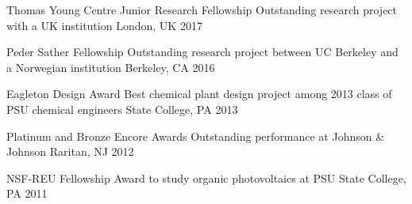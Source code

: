 
\begin{cvhonors}

  \cvhonor
    {Thomas Young Centre Junior Research Fellowship} %
    {Outstanding research project with a UK institution} %
    {London, UK} %
    {2017} %

  \cvhonor
    {Peder Sather Fellowship} %
    {Outstanding research project between UC Berkeley and a Norwegian institution} %
    {Berkeley, CA} %
    {2016} %

  \cvhonor
    {Eagleton Design Award} %
    {Best chemical plant design project among 2013 class of PSU chemical engineers} %
    {State College, PA} %
    {2013} %

  \cvhonor
    {Platinum and Bronze Encore Awards} %
    {Outstanding performance at Johnson \& Johnson} %
    {Raritan, NJ} %
    {2012} %

  \cvhonor
    {NSF-REU Fellowship} %
    {Award to study organic photovoltaics at PSU} %
    {State College, PA} %
    {2011} %

\end{cvhonors}






